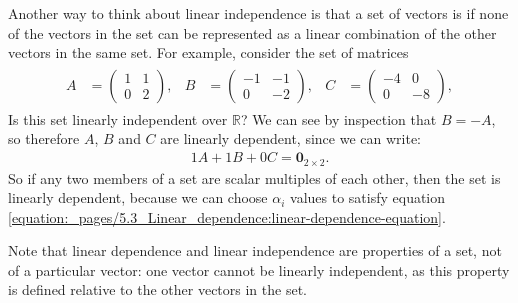 \documentclass[letterpaper,10pt,english]{jupyterBook}
\begin{document}
\sphinxAtStartPar
Another way to think about linear independence is that a set of vectors is  if none of the vectors in the set can be represented as a linear combination of the other vectors in the same set. For example, consider the set of matrices
\begin{equation*}
\begin{split} \begin{align*}
    A &= \begin{pmatrix} 1 & 1 \\ 0 & 2 \end{pmatrix}, &
    B &= \begin{pmatrix} -1 & -1 \\ 0 & -2 \end{pmatrix}, &
    C &= \begin{pmatrix} -4 & 0 \\ 0 & -8 \end{pmatrix},
\end{align*} \end{split}
\end{equation*}
\sphinxAtStartPar
Is this set linearly independent over \(\mathbb{R}\)? We can see by inspection that \(B = -A\), so therefore \(A\), \(B\) and \(C\) are linearly dependent, since we can write:
\begin{equation*}
\begin{split} 1A + 1B + 0C = \mathbf{0}_{2\times 2}. \end{split}
\end{equation*}
\sphinxAtStartPar
So if any two members of a set are scalar multiples of each other, then the set is linearly dependent, because we can choose \(\alpha_i\) values to satisfy equation \eqref{equation:_pages/5.3_Linear_dependence:linear-dependence-equation}.

\sphinxAtStartPar
Note that linear dependence and linear independence are properties of a set, not of a particular vector: one vector cannot be linearly independent, as this property is defined relative to the other vectors in the set.
\end{document}
